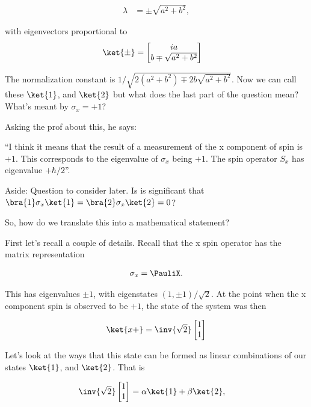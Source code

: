 \begin{align}\label{eqn:desaiCh5:202}
\lambda &= \pm \sqrt{a^2 + b^2},
\end{align}

with eigenvectors proportional to
\begin{align}\label{eqn:desaiCh5:203}
\ket{\pm} &=
\begin{bmatrix}
i a \\
b \mp \sqrt{a^2 + b^2}
\end{bmatrix}
\end{align}

The normalization constant is $1/\sqrt{2 (a^2 + b^2) \mp 2 b \sqrt{a^2 + b^2}}$.  Now we can call these $\ket{1}$, and $\ket{2}$ but what does the last part of the question mean?  What's meant by $\sigma_x = +1$?

Asking the prof about this, he says:

``I think it means that the result of a measurement of the x component of spin is $+1$. This corresponds to the eigenvalue of $\sigma_x$ being $+1$. The spin operator $S_x$ has eigenvalue $+\hbar/2$''.

Aside: Question to consider later.  Is is significant that $\bra{1} \sigma_x \ket{1} = \bra{2} \sigma_x \ket{2} = 0$?

So, how do we translate this into a mathematical statement?

First let's recall a couple of details.  Recall that the x spin operator has the matrix representation

\begin{align}\label{eqn:desaiCh5:204}
\sigma_x = \PauliX.
\end{align}

This has eigenvalues $\pm 1$, with eigenstates $(1,\pm 1)/\sqrt{2}$.  At the point when the x component spin is observed to be $+1$, the state of the system was then

\begin{align}\label{eqn:desaiCh5:205}
\ket{x+} =
\inv{\sqrt{2}}
\begin{bmatrix}
1 \\
1
\end{bmatrix}
\end{align}

Let's look at the ways that this state can be formed as linear combinations of our states $\ket{1}$, and $\ket{2}$.  That is

\begin{align}\label{eqn:desaiCh5:206}
\inv{\sqrt{2}}
\begin{bmatrix}
1 \\
1
\end{bmatrix}
&=
\alpha \ket{1}
+ \beta \ket{2},
\end{align}

